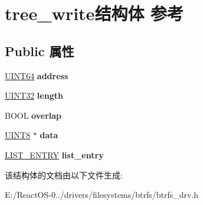 \hypertarget{structtree__write}{}\section{tree\+\_\+write结构体 参考}
\label{structtree__write}
\subsection*{Public 属性}
\begin{DoxyCompactItemize}
\item 
\mbox{\label{structtree__write_a2a8f8e3471b29b23b5251bca3400f364}} 
\hyperlink{_processor_bind_8h_a57be03562867144161c1bfee95ca8f7c}{U\+I\+N\+T64} {\bfseries address}
\item 
\mbox{\label{structtree__write_a2adbb055e8d77bb935d44328f8e3249d}} 
\hyperlink{_processor_bind_8h_ae1e6edbbc26d6fbc71a90190d0266018}{U\+I\+N\+T32} {\bfseries length}
\item 
\mbox{\label{structtree__write_a16cfbf519cea63634f174e7155383cb3}} 
B\+O\+OL {\bfseries overlap}
\item 
\mbox{\label{structtree__write_a17cd93008dd6f145c64d452f262d8638}} 
\hyperlink{_processor_bind_8h_ab27e9918b538ce9d8ca692479b375b6a}{U\+I\+N\+T8} $\ast$ {\bfseries data}
\item 
\mbox{\label{structtree__write_ac24a21b3475ee8e16f37440c25085b5c}} 
\hyperlink{struct___l_i_s_t___e_n_t_r_y}{L\+I\+S\+T\+\_\+\+E\+N\+T\+RY} {\bfseries list\+\_\+entry}
\end{DoxyCompactItemize}


该结构体的文档由以下文件生成\+:\begin{DoxyCompactItemize}
\item 
E\+:/\+React\+O\+S-\/0../drivers/filesystems/btrfs/btrfs\+\_\+drv.\+h\end{DoxyCompactItemize}
